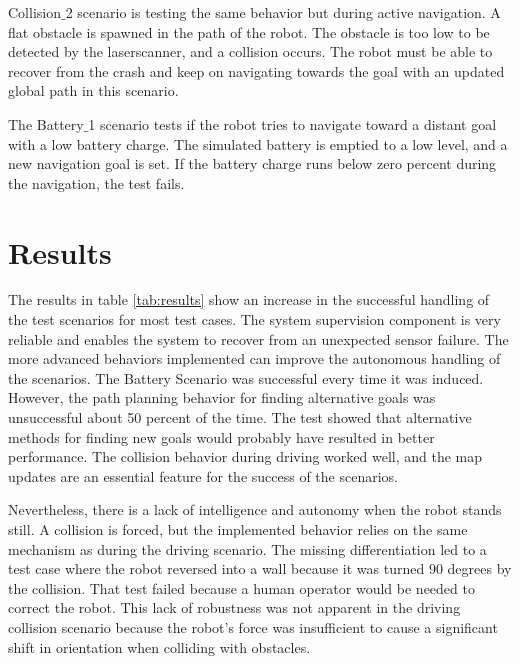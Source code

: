 Collision$\_$2 scenario is testing the same behavior but during active navigation. A flat obstacle is spawned in the path of the robot. The obstacle is too low to be detected by the laserscanner, and a collision occurs. The robot must be able to recover from the crash and keep on navigating towards the goal with an updated global path in this scenario. 

The Battery$\_$1 scenario tests if the robot tries to navigate toward a distant goal with a low battery charge. The simulated battery is emptied to a low level, and a new navigation goal is set. If the battery charge runs below zero percent during the navigation, the test fails. 

\section{Results}

The results in table \ref{tab:results} show an increase in the successful handling of the test scenarios for most test cases. The system supervision component is very reliable and enables the system to recover from an unexpected sensor failure. The more advanced behaviors implemented can improve the autonomous handling of the scenarios. The Battery Scenario was successful every time it was induced. However, the path planning behavior for finding alternative goals was unsuccessful about 50 percent of the time. The test showed that alternative methods for finding new goals would probably have resulted in better performance. The collision behavior during driving worked well, and the map updates are an essential feature for the success of the scenarios.

Nevertheless, there is a lack of intelligence and autonomy when the robot stands still. A collision is forced, but the implemented behavior relies on the same mechanism as during the driving scenario. The missing differentiation led to a test case where the robot reversed into a wall because it was turned 90 degrees by the collision. That test failed because a human operator would be needed to correct the robot. This lack of robustness was not apparent in the driving collision scenario because the robot's force was insufficient to cause a significant shift in orientation when colliding with obstacles. 


